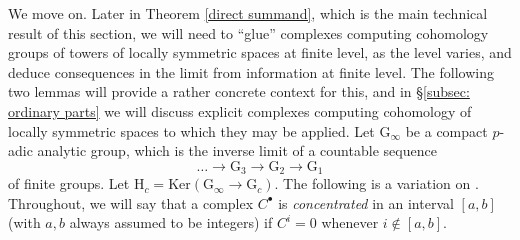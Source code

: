 \documentclass{amsart}
\theoremstyle{remark}
\numberwithin{equation}{subsection}
\renewcommand{\(}{\left(}
\renewcommand{\)}{\right)}
\begin{document}
\medskip

We move on. Later in Theorem \ref{direct summand}, which is the main technical result of this section, we will need to ``glue'' complexes computing cohomology groups of towers of locally symmetric spaces at finite level, as the level varies, and deduce consequences in the limit from information at finite level. The following two lemmas will provide a rather concrete context for this, and in \S \ref{subsec: ordinary parts} we will discuss explicit complexes computing cohomology of locally symmetric spaces to which they may be applied. Let $\mathrm{G}_\infty$ be a compact $p$-adic analytic group, which is the inverse limit of a countable sequence
\[
\dots \to \mathrm{G}_3 \to \mathrm{G}_2 \to \mathrm{G}_1
\]
of finite groups. Let $\mathrm{H}_c = \mathrm{Ker}(\mathrm{G}_\infty \to \mathrm{G}_c)$.  The following is a variation on \cite[Lemma 2.13]{khare-thorne}. Throughout, we will say that a complex $C^\bullet$ is \emph{concentrated} in an interval $[a,b]$ (with $a,b$ always assumed to be integers) if $C^i=0$ whenever $i \notin [a,b]$.
\end{document}
